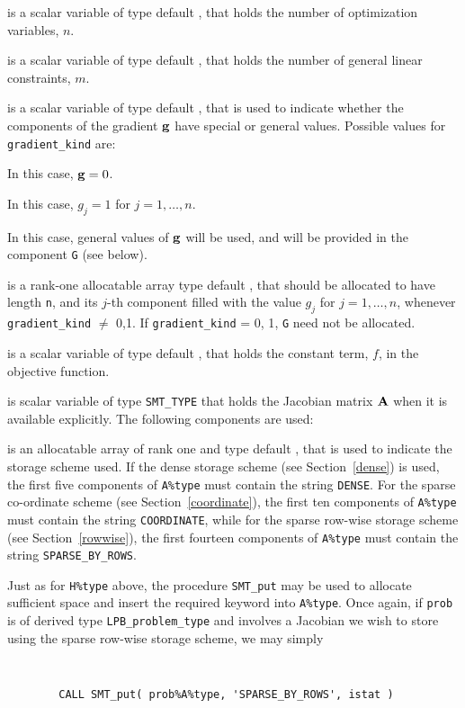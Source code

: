 \documentclass{galahad}
\newcommand{\packagename}{LPB}
\begin{document}
\begin{description}

 is a scalar variable of type default \integer,
 that holds the number of optimization variables, $n$.

 is a scalar variable of type default \integer,
 that holds the number of general linear constraints, $m$.

 is a scalar variable of type default \integer,
that is used to indicate whether the components of the gradient ${\mathbf{g}}$
have special or general values. Possible values for {\tt gradient\_kind} are:
\begin{description}
  In this case, ${\mathbf{g}} = 0$.

 In this case, $g_{j} = 1$ for $j = 1, \ldots , n$.

 In this case, general values of ${\mathbf{g}}$ will be used,
     and will be provided in the component {\tt G} (see below).
\end{description}

 is a rank-one allocatable array type default \realdp, that
should be allocated to have length {\tt n}, and its $j$-th component
filled with the value $g_{j}$ for $j = 1, \ldots , n$,
whenever {\tt gradient\_kind} $\neq$ 0,1.
If {\tt gradient\_kind} {= 0, 1}, {\tt G} need not be allocated.

 is a scalar variable of type
default \realdp, that holds
the constant term, $f$, in the objective function.

 is scalar variable of type {\tt SMT\_TYPE}
that holds the Jacobian matrix ${\mathbf{A}}$ when it is available explicitly.
The following components are used:

\begin{description}

 is an allocatable array of rank one and type default \character,
that is used to indicate the storage scheme used. If the dense storage scheme
(see Section~\ref{dense}) is used,
the first five components of {\tt A\%type} must contain the
string {\tt DENSE}.
For the sparse co-ordinate scheme (see Section~\ref{coordinate}),
the first ten components of {\tt A\%type} must contain the
string {\tt COORDINATE}, while
for the sparse row-wise storage scheme (see Section~\ref{rowwise}),
the first fourteen components of {\tt A\%type} must contain the
string {\tt SPARSE\_BY\_ROWS}.

Just as for {\tt H\%type} above, the procedure {\tt SMT\_put}
may be used to allocate sufficient space and insert the required keyword
into {\tt A\%type}.
Once again, if {\tt prob} is of derived type {\tt \packagename\_problem\_type}
and involves a Jacobian we wish to store using the sparse row-wise
storage scheme, we may simply
{\tt
\begin{verbatim}
        CALL SMT_put( prob%A%type, 'SPARSE_BY_ROWS', istat )
\end{verbatim}
}
\noindent


\end{description}
\end{description}
\end{document}
